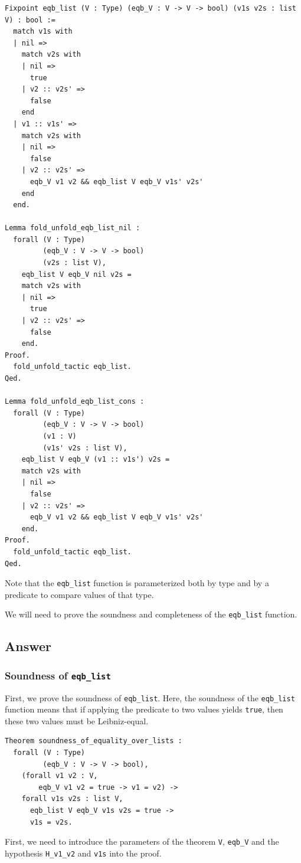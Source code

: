 \documentclass{article}
\begin{document}
\begin{lstlisting}
Fixpoint eqb_list (V : Type) (eqb_V : V -> V -> bool) (v1s v2s : list V) : bool :=
  match v1s with
  | nil =>
    match v2s with
    | nil =>
      true
    | v2 :: v2s' =>
      false
    end
  | v1 :: v1s' =>
    match v2s with
    | nil =>
      false
    | v2 :: v2s' =>
      eqb_V v1 v2 && eqb_list V eqb_V v1s' v2s'
    end
  end.

Lemma fold_unfold_eqb_list_nil :
  forall (V : Type)
         (eqb_V : V -> V -> bool)
         (v2s : list V),
    eqb_list V eqb_V nil v2s =
    match v2s with
    | nil =>
      true
    | v2 :: v2s' =>
      false
    end.
Proof.
  fold_unfold_tactic eqb_list.
Qed.

Lemma fold_unfold_eqb_list_cons :
  forall (V : Type)
         (eqb_V : V -> V -> bool)
         (v1 : V)
         (v1s' v2s : list V),
    eqb_list V eqb_V (v1 :: v1s') v2s =
    match v2s with
    | nil =>
      false
    | v2 :: v2s' =>
      eqb_V v1 v2 && eqb_list V eqb_V v1s' v2s'
    end.
Proof.
  fold_unfold_tactic eqb_list.
Qed.
\end{lstlisting}

Note that the \texttt{eqb\_list} function is parameterized both by type and by a predicate to compare values of that type. 

We will need to prove the soundness and completeness of the \texttt{eqb\_list} function.

\subsection{Answer}
\subsubsection{Soundness of \texttt{eqb\_list}}

First, we prove the soundness of \texttt{eqb\_list}. Here, the soundness of the \texttt{eqb\_list} function means that if applying the predicate to two values yields \texttt{true}, then these two values must be Leibniz-equal. 

\begin{lstlisting}
Theorem soundness_of_equality_over_lists :
  forall (V : Type)
         (eqb_V : V -> V -> bool),
    (forall v1 v2 : V,
        eqb_V v1 v2 = true -> v1 = v2) ->
    forall v1s v2s : list V,
      eqb_list V eqb_V v1s v2s = true ->
      v1s = v2s.
\end{lstlisting}

First, we need to introduce the parameters of the theorem \texttt{V}, \texttt{eqb\_V} and the hypothesis \texttt{H\_v1\_v2} and \texttt{v1s} into the proof. 
\end{document}
